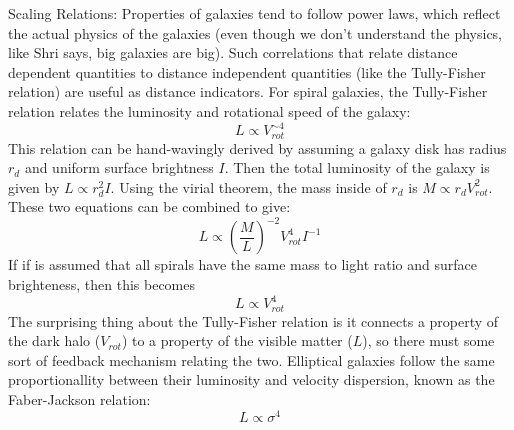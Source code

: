 Scaling Relations:\newline
Properties of galaxies tend to follow power laws, which reflect the actual 
physics of the galaxies (even though we don't understand the physics, like 
Shri says, big galaxies are big).  Such correlations that relate distance 
dependent quantities to distance independent quantities (like the Tully-Fisher 
relation) are useful as distance indicators.  For spiral galaxies, the 
Tully-Fisher relation relates the luminosity and rotational speed of the 
galaxy:
\begin{equation}
L\propto V_{rot}^{\sim4}
\end{equation}
This relation can be hand-wavingly derived by assuming a galaxy disk has 
radius $r_d$ and uniform surface brightness $I$.  Then the total luminosity 
of the galaxy is given by $L\propto r_d^2I$.  Using the virial theorem, the 
mass inside of $r_d$ is $M\propto r_dV_{rot}^2$.  These two equations can 
be combined to give:
\begin{equation}
L\propto \left(\frac{M}{L}\right)^{-2}V_{rot}^4I^{-1}
\end{equation}
If if is assumed that all spirals have the same mass to light ratio and 
surface brighteness, then this becomes 
\begin{equation}
L\propto V_{rot}^4
\end{equation}
The surprising thing about the Tully-Fisher relation is it connects a property 
of the dark halo ($V_{rot}$) to a property of the visible matter ($L$), so 
there must some sort of feedback mechanism relating the two.  Elliptical 
galaxies follow the same proportionallity between their luminosity and 
velocity dispersion, known as the Faber-Jackson relation:
\begin{equation}
L\propto \sigma^4
\end{equation}

